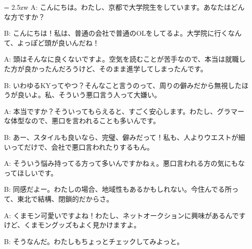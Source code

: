\documentclass[11pt]{amsart}
\title{}
\author{}
\newenvironment{hangall}[1]{\hangindent = 2.5zw\everypar{\hangindent = 2.5zw}}{}
\begin{document}
\maketitle
\begin{hangall}{}%
A: こんにちは。わたし、京都で大学院生をしています。あなたはどんな方ですか？



B: こんにちは！私は、普通の会社で普通のOLをしてるよ。大学院に行くなんて、よっぽど頭が良いんだね！



A: 頭はそんなに良くないですよ。空気を読むことが苦手なので、本当は就職した方が良かったんだろうけど、そのまま進学してしまったんです。



B: いわゆるKYってやつ？そんなこと言うのって、周りの僻みだから無視したほうが良いよ。私、そういう悪口言う人って大嫌い。



A: 本当ですか？そういってもらえると、すごく安心します。わたし、グラマーな体型なので、悪口を言われることも多いんです。



B: あー、スタイルも良いなら、完璧、僻みだって！私も、人よりウエストが細いってだけで、会社で悪口言われたりするもん。



A: そういう悩み持ってる方って多いんですかねぇ。悪口言われる方の気にもなってほしいです。



B: 同感だよー。わたしの場合、地域性もあるかもしれない。今住んでる所って、東北で結構、閉鎖的だからさ。



A: くまモン可愛いですよね！わたし、ネットオークションに興味があるんですけど、くまモングッズもよく見かけますよ。



B: そうなんだ。わたしもちょっとチェックしてみよっと。\end{hangall}
\end{document}
